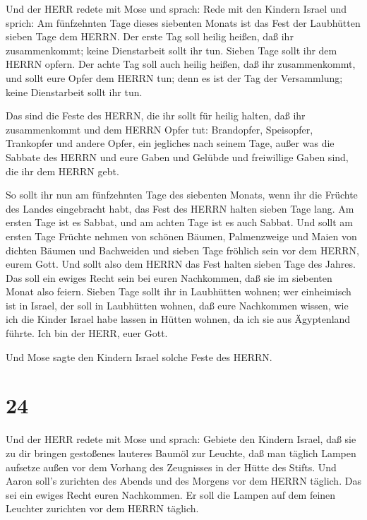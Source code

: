  Und der HERR redete mit Mose und sprach: 
Rede mit den Kindern Israel und sprich: Am fünfzehnten Tage dieses
siebenten Monats ist das Fest der Laubhütten sieben Tage dem HERRN.
 Der erste Tag soll heilig heißen, daß ihr zusammenkommt;
keine Dienstarbeit sollt ihr tun.  Sieben Tage sollt ihr
dem HERRN opfern. Der achte Tag soll auch heilig heißen, daß ihr
zusammenkommt, und sollt eure Opfer dem HERRN tun; denn es ist der Tag
der Versammlung; keine Dienstarbeit sollt ihr tun.

 Das sind die Feste des HERRN, die ihr sollt für heilig
halten, daß ihr zusammenkommt und dem HERRN Opfer tut: Brandopfer,
Speisopfer, Trankopfer und andere Opfer, ein jegliches nach seinem Tage,
 außer was die Sabbate des HERRN und eure Gaben und Gelübde
und freiwillige Gaben sind, die ihr dem HERRN gebt.

 So sollt ihr nun am fünfzehnten Tage des siebenten Monats,
wenn ihr die Früchte des Landes eingebracht habt, das Fest des HERRN
halten sieben Tage lang. Am ersten Tage ist es Sabbat, und am achten
Tage ist es auch Sabbat.  Und sollt am ersten Tage Früchte
nehmen von schönen Bäumen, Palmenzweige und Maien von dichten Bäumen und
Bachweiden und sieben Tage fröhlich sein vor dem HERRN, eurem Gott.
 Und sollt also dem HERRN das Fest halten sieben Tage des
Jahres. Das soll ein ewiges Recht sein bei euren Nachkommen, daß sie im
siebenten Monat also feiern.  Sieben Tage sollt ihr in
Laubhütten wohnen; wer einheimisch ist in Israel, der soll in Laubhütten
wohnen,  daß eure Nachkommen wissen, wie ich die Kinder
Israel habe lassen in Hütten wohnen, da ich sie aus Ägyptenland führte.
Ich bin der HERR, euer Gott.

 Und Mose sagte den Kindern Israel solche Feste des HERRN.

\hypertarget{section-23}{%
\section{24}\label{section-23}}

 Und der HERR redete mit Mose und sprach: 
Gebiete den Kindern Israel, daß sie zu dir bringen gestoßenes lauteres
Baumöl zur Leuchte, daß man täglich Lampen aufsetze  außen
vor dem Vorhang des Zeugnisses in der Hütte des Stifts. Und Aaron soll's
zurichten des Abends und des Morgens vor dem HERRN täglich. Das sei ein
ewiges Recht euren Nachkommen.  Er soll die Lampen auf dem
feinen Leuchter zurichten vor dem HERRN täglich.


